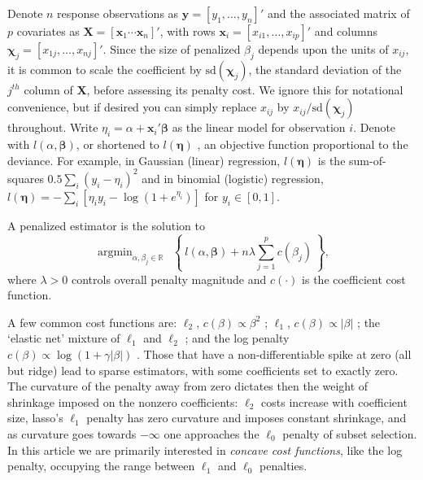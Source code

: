 \documentclass[12pt]{article}
\newcommand{\bs}[1]{\boldsymbol{#1}}
\newcommand{\mr}[1]{\mathrm{#1}}
\newcommand{\bm}[1]{\mathbf{#1}}
\newcommand{\ds}[1]{\mathds{#1}}
\DeclareMathOperator*{\argmin}{argmin}
\begin{document}
Denote $n$ response observations as $\bm{y} = [y_1,\ldots,y_n]'$ and the associated matrix of $p$ covariates as $\bm{X} =
[\bm{x}_1 \cdots \bm{x}_n]'$, with rows $\bm{x}_i = [x_{i1},\ldots,x_{ip}]'$ and columns $\bs{\chi}_j = [x_{1j},\ldots,x_{nj}]'$. Since the size of penalized $\beta_j$ depends upon the units of $x_{ij}$,  it is common to scale
the coefficient by $\mr{sd}(\bs{\chi}_j)$, the standard deviation of the $j^{th}$ column
of $\bm{X}$, before assessing its penalty cost.  We ignore this for notational convenience, but if desired you can simply replace $x_{ij}$ by $x_{ij}/\mr{sd}(\bs{\chi}_j)$
throughout. Write $\eta_{i} =
\alpha+\bm{x}_i'\bs{\beta}$ as the linear model  for observation $i$.  Denote with $l(\alpha, \bs{\beta})$, or shortened to $l(\bs{\eta})$ ,  an objective function proportional to the deviance.  For example, in Gaussian (linear)
regression, $l(\bs{\eta})$ is the sum-of-squares $0.5\sum_i \left(y_i - \eta_i\right)^2$ and in binomial (logistic)
regression,  $l(\bs{\eta}) = -\sum_i \left[\eta_iy_i -
\log(1+e^{\eta_i})\right]$ for $y_i \in [0,1]$. 

A penalized estimator is  the
solution to
\begin{equation} \label{pendev}
\argmin_{\alpha,\beta_j\in\ds{R}}~~\left\{~l(\alpha,{\bs{\beta}}) + n\lambda \sum_{j=1}^p c(\beta_j)~\right\},
\end{equation}
where $\lambda>0$ controls overall penalty magnitude and  $c(\cdot)$ is the  coefficient cost function.
 
A few common cost functions are: 
$\ell_2$, $c(\beta) \propto \beta^2$ \citep[ridge,][]{hoerl_ridge_1970}; $\ell_1$, $c(\beta) \propto |\beta|$ \citep[lasso,][]{tibshirani_regression_1996}; the `elastic net' mixture of $\ell_1$ and $\ell_2$ \citep{zou_regularization_2005}; and the log penalty $c(\beta) \propto \log(1+\gamma|\beta|)$ \citep{candes_enhancing_2008}.  Those that have
a non-differentiable spike at zero (all but ridge) lead to sparse estimators,
with some coefficients set to exactly zero.   The curvature of the penalty
away from zero dictates then the weight of shrinkage imposed on the nonzero
coefficients:  $\ell_2$ costs increase with coefficient size,  lasso's $\ell_1$
penalty has zero curvature and imposes constant shrinkage, and as curvature
goes towards $-\infty$ one approaches the $\ell_0$ penalty of subset selection.
In this article we are primarily interested in {\it concave cost functions},
like the log penalty, occupying the range between $\ell_1$ and $\ell_0$ penalties.
\end{document}
